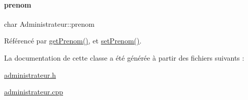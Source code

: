 \paragraph{\texorpdfstring{prenom}{prenom}}
{\footnotesize\ttfamily char Administrateur\+::prenom\hspace{0.3cm}{\ttfamily [private]}}



Référencé par \hyperlink{class_administrateur_a05a90b3a0185837ac81da4b8411f82bb}{get\+Prenom()}, et \hyperlink{class_administrateur_a9dd74a2ca87a1ab7618ebfbe50562731}{set\+Prenom()}.



La documentation de cette classe a été générée à partir des fichiers suivants \+:\begin{DoxyCompactItemize}
\item 
\hyperlink{administrateur_8h}{administrateur.\+h}\item 
\hyperlink{administrateur_8cpp}{administrateur.\+cpp}\end{DoxyCompactItemize}
